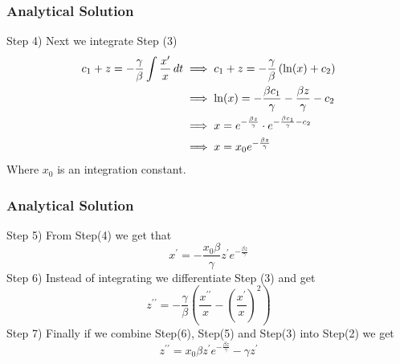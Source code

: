 \documentclass{beamer}
\begin{document}
\begin{frame}\frametitle{Analytical Solution}
Step 4) Next we integrate Step (3)
\begin{equation*} 
	\begin{split}
		c_{1} + z = -\frac{\gamma}{\beta} \int \frac{x^{\prime}}{x} \,dt
		 & \implies c_{1} + z = -\frac{\gamma}{\beta}\left(\ln(x) + c_{2}\right)                                       \\
		 & \implies \ln(x) = -\frac{\beta c_{1}}{\gamma} -\frac{\beta z}{\gamma} - c_{2}                               \\
		 & \implies x = e^{-\frac{\beta z}{\gamma}} \cdot e^{-\frac{\beta c_{1}}{\gamma} - c_{2}}                      \\
		 & \implies x = x_{0}e^{-\frac{\beta z}{\gamma}}  \hspace{\parindent}  
	\end{split}
\end{equation*}
Where $x_{0}$ is an integration constant.
\end{frame}

\begin{frame}\frametitle{Analytical Solution}
    Step 5) From Step(4) we get that 
    \begin{equation*} 
        x^{\prime} = -\frac{x_{0}\beta}{\gamma} z^{\prime} e^{-\frac{\beta z}{\gamma}}
    \end{equation*}
    Step 6) Instead of integrating we differentiate Step (3) and get
    \begin{equation*}
        z^{\prime\prime} = -\frac{\gamma}{\beta}\left(\frac{x^{\prime\prime}}{x} - \left(\frac{x^{\prime}}{x}\right)^{2} \right)
    \end{equation*}
    Step 7) Finally if we combine Step(6), Step(5) and Step(3) into Step(2) we get
    \begin{equation*}
        z^{\prime\prime} = x_{0} \beta z^{\prime} e^{-\frac{\beta z}{\gamma}} - \gamma z^{\prime}
    \end{equation*}
\end{frame}
\end{document}
